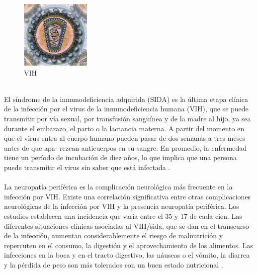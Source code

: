 \documentclass[a4paper,twocolumn,10pt]{article}
\begin{document}
\begin{figure}[htb]
\centering
\includegraphics[width=0.3\textwidth]{./VIH1}
\caption {VIH \cite{Wikipedia2018}}
\label{fig:VIH}
\end{figure}
\\ 
El síndrome de la inmunodeficiencia adquirida (SIDA) es la última etapa clínica de la infección por el virus de la inmunodeficiencia humana (VIH), que se puede transmitir por vía sexual, por transfusión sanguínea y de la madre al hijo, ya sea durante el embarazo, el parto o la lactancia materna. A partir del momento en que el virus entra al cuerpo humano pueden pasar de dos semanas a tres meses antes de que apa- rezcan anticuerpos en su sangre. En promedio, la enfermedad tiene un período de incubación de diez años, lo que implica que una persona puede transmitir el virus sin saber que está infectada \cite{LinaMariaVera2004}. \\ \\
La neuropatía periférica es la complicación neurológica más frecuente en la infección por VIH. Existe una correlación significativa entre otras complicaciones neurológicas de la infección por VIH y la presencia neuropatía periférica. Los estudios establecen una incidencia que varía entre el 35 y 17 de cada cien. Las diferentes situaciones clínicas asociadas al VIH/sida, que se dan en el transcurso de la infección, aumentan considerablemente el riesgo de malnutrición y repercuten en el consumo, la digestión y el aprovechamiento de los alimentos. Las infecciones en la boca y en el tracto digestivo, las náuseas o el vómito, la diarrea y la pérdida de peso son más tolerados con un buen estado nutricional \cite{Herrera2004}.
\end{document}
